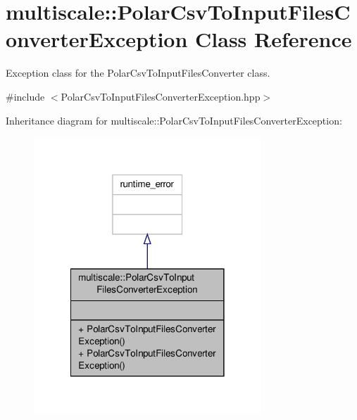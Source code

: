 \hypertarget{classmultiscale_1_1PolarCsvToInputFilesConverterException}{\section{multiscale\-:\-:Polar\-Csv\-To\-Input\-Files\-Converter\-Exception Class Reference}
\label{classmultiscale_1_1PolarCsvToInputFilesConverterException}
}


Exception class for the Polar\-Csv\-To\-Input\-Files\-Converter class.  




{\ttfamily \#include $<$Polar\-Csv\-To\-Input\-Files\-Converter\-Exception.\-hpp$>$}



Inheritance diagram for multiscale\-:\-:Polar\-Csv\-To\-Input\-Files\-Converter\-Exception\-:\nopagebreak
\begin{figure}[H]
\begin{center}
\leavevmode
\includegraphics[width=242pt]{classmultiscale_1_1PolarCsvToInputFilesConverterException__inherit__graph}
\end{center}
\end{figure}


